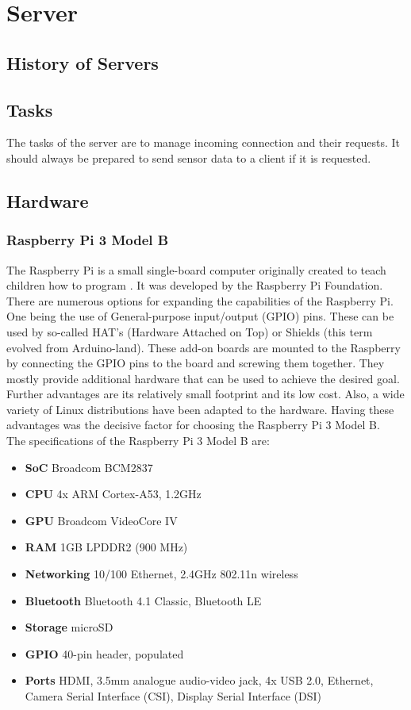 \chapter{Server}
\label{ch:server}

\section{History of Servers}

\section{Tasks}
The tasks of the server are to manage incoming connection and their requests. It should always be prepared to send sensor data to a client if it is requested.
\section{Hardware}
\subsection{Raspberry Pi 3 Model B}
The Raspberry Pi is a small single-board computer originally created to teach children how to program \cite{RasPi}. It was developed by the Raspberry Pi Foundation. There are numerous options for expanding the capabilities of the Raspberry Pi. One being the use of General-purpose input/output (GPIO) pins. These can be used by so-called HAT's (Hardware Attached on Top) or Shields (this term evolved from Arduino-land). These add-on boards are mounted to the Raspberry by connecting the GPIO pins to the board and screwing them together. They mostly provide additional hardware that can be used to achieve the desired goal. Further advantages are its relatively small footprint and its low cost. Also, a wide variety of Linux distributions have been adapted to the hardware. Having these advantages was the decisive factor for choosing the Raspberry Pi 3 Model B.\\
The specifications of the Raspberry Pi 3 Model B are:

\begin{itemize}
	\item \textbf{SoC} Broadcom BCM2837
	\item \textbf{CPU} 4x ARM Cortex-A53, 1.2GHz
	\item \textbf{GPU} Broadcom VideoCore IV
	\item \textbf{RAM} 1GB LPDDR2 (900 MHz)
	\item \textbf{Networking} 10/100 Ethernet, 2.4GHz 802.11n wireless
	\item \textbf{Bluetooth} Bluetooth 4.1 Classic, Bluetooth LE
	\item \textbf{Storage} microSD
	\item \textbf{GPIO} 40-pin header, populated
	\item \textbf{Ports} HDMI, 3.5mm analogue audio-video jack, 4x USB 2.0, Ethernet, Camera Serial Interface (CSI), Display Serial Interface (DSI)
\end{itemize}

